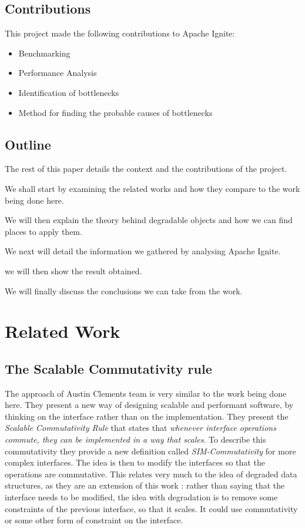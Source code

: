 \documentclass[conference]{IEEEtran}
\begin{document}
\subsection{Contributions}
This project made the following contributions to Apache Ignite:
\begin{itemize}
  \item Benchmarking
  \item Performance Analysis
  \item Identification of bottlenecks
  \item Method for finding the probable causes of bottlenecks
\end{itemize}

\subsection{Outline}
The rest of this paper details the context and the contributions of the project.

We shall start by examining the related works and how they compare to the work being done here.

We will then explain the theory behind degradable objects and how we can find places to apply them.

We next will detail the information we gathered by analysing Apache Ignite.

we will then show the result obtained.

We will finally discuss the conclusions we can take from the work.

\bigbreak 

\section{Related Work}
\subsection{The Scalable Commutativity rule}
The approach of Austin Clements \cite{scalable} team is very similar to the work being done here. They present a new way of designing scalable and performant software, by thinking on the interface rather than on the implementation. They present the \textit{Scalable Commutativity Rule} that states that \textit{whenever interface operations commute, they can be implemented in a way that scales}. To describe this commutativity they provide a new definition called \textit{SIM-Commutativity} for more complex interfaces. The idea is then to modify the interfaces so that the operations are commutative. This relates very much to the idea of degraded data structures, as they are an extension of this work : rather than saying that the interface needs to be modified, the idea with degradation is to remove some constraints of the previous interface, so that it scales. It could use commutativity or some other form of constraint on the interface.
\end{document}
